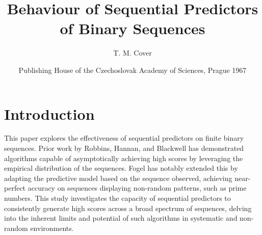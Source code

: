 \documentclass[11pt]{article}
\title{
    \huge Behaviour of Sequential Predictors of Binary Sequences\\
    \vspace{10pt}
}
\author{T. M. Cover}
\date{Publishing House of the Czechoslovak Academy of Sciences, Prague 1967}
\numberwithin{equation}{section}
\theoremstyle{boldStyle}
\begin{document}
\maketitle

\section{Introduction}

This paper explores the effectiveness of sequential predictors on finite binary sequences. 
Prior work by Robbins, Hannan, and Blackwell has demonstrated algorithms capable of asymptotically achieving high scores by leveraging 
the empirical distribution of the sequences. Fogel has notably extended this by adapting the predictive model based on the sequence observed, 
achieving near-perfect accuracy on sequences displaying non-random patterns, such as prime numbers. This study investigates the capacity of sequential 
predictors to consistently generate high scores across a broad spectrum of sequences, delving into the inherent limits and potential of 
such algorithms in systematic and non-random environments.


\end{document}
